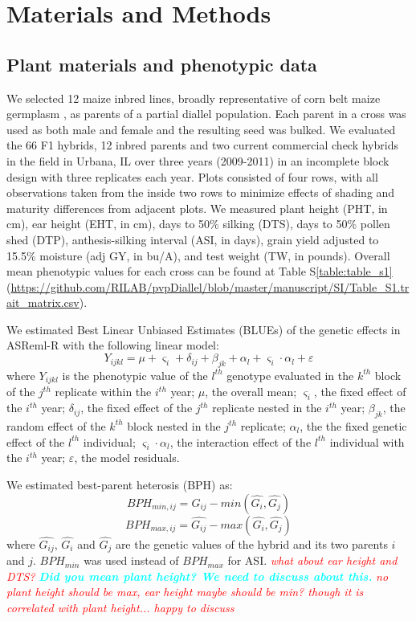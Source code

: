 \documentclass[9pt,twocolumn,twoside]{gsajnl}
\newcommand{\yang}[1]{\textcolor{cyan}{\emph{\bf  #1}} }
\newcommand{\jri}[1]{\textcolor{red}{ \emph{ #1}} }
\begin{document}
\section*{Materials and Methods} 

\subsection*{Plant materials and phenotypic data}
We selected 12 maize inbred lines, broadly representative of corn belt maize germplasm \citep{mikel2006evolution}, as parents of a partial diallel population. 
Each parent in a cross was used as both male and female and the resulting seed was bulked. 
We evaluated the 66 F1 hybrids, 12 inbred parents and two current commercial check hybrids in the field in Urbana, IL over three years (2009-2011) in an incomplete block design with three replicates each year.  
Plots consisted of four rows, with all observations taken from the inside two rows to minimize effects of shading and maturity differences from adjacent plots.  
We measured plant height (PHT, in cm), ear height (EHT, in cm), days to 50\% silking (DTS), days to 50\% pollen shed (DTP), anthesis-silking interval (ASI, in days), grain yield adjusted to 15.5\% moisture (adj GY, in bu/A), and test weight (TW, in pounds). 
Overall mean phenotypic values for each cross can be found at Table S\ref{table:table_s1} (\url{https://github.com/RILAB/pvpDiallel/blob/master/manuscript/SI/Table_S1.trait_matrix.csv}).

We estimated Best Linear Unbiased Estimates (BLUEs) of the genetic effects in ASReml-R \citep{gilmour2009asreml} with the following linear model: 
\[Y_{ijkl} = \mu + \varsigma_{i} + \delta_{ij} + \beta_{jk} + \alpha_{l} +  \varsigma_{i} \cdot \alpha_{l} + \varepsilon\]
where 
$Y_{ijkl}$ is the phenotypic value of the $l^{th}$ genotype evaluated in the $k^{th}$ block of the $j^{th}$ replicate within the $i^{th}$ year; 
$\mu$, the overall mean; 
$\varsigma_{i}$, the fixed effect of the $i^{th}$ year;
$\delta_{ij}$, the fixed effect of the $j^{th}$ replicate nested in the $i^{th}$ year; 
$\beta_{jk}$, the random effect of the $k^{th}$ block nested in the $j^{th}$ replicate; 
$\alpha_{l}$, the the fixed genetic effect  of the $l^{th}$ individual; 
$\varsigma_{i} \cdot \alpha_{l}$, the interaction effect of the $l^{th}$ individual with the $i^{th}$ year; 
$\varepsilon$, the model residuals. 

We estimated best-parent heterosis (BPH) as:
\[ BPH_{min,ij}=\hat{G_{ij}}-min(\hat{G_{i}} ,\hat{G_{j}}) \] 
\[ BPH_{max,ij}=\hat{G_{ij}}-max(\hat{G_{i}} ,\hat{G_{j}}) \]
where $\hat{G_{ij}}$, $\hat{G_{i}}$ and $\hat{G_{j}}$ are the genetic values of the hybrid and its two parents $i$ and $j$. $BPH_{min}$ was used instead of $BPH_{max}$ for ASI. \jri{what about ear height and DTS?} \yang{Did you mean plant height? We need to discuss about this.} \DIFaddbegin \jri{no plant height should be max, ear height maybe should be min? though it is correlated with plant height... happy to discuss}
\DIFaddend 
\end{document}
